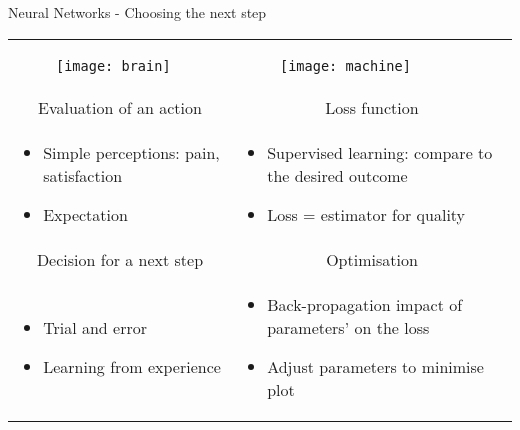 \begin{frame}{Neural Networks - Choosing the next step}
\begin{tabular}{p{5cm}|p{5cm}}
    \begin{figure}
    	\texttt{[image: brain]}
    \end{figure}
    & 
    \begin{figure}
    	\texttt{[image: machine]}
    \end{figure} \\
  \multicolumn{1}{c|}{Evaluation of an action} & \multicolumn{1}{c}{Loss function} \\
    \begin{itemize}
        \item Simple perceptions: pain, satisfaction
        \item Expectation
    \end{itemize}
    & 
    \begin{itemize}
      \item Supervised learning: compare to the desired outcome
      \item Loss = estimator for quality
    \end{itemize} \\
\multicolumn{1}{c|}{Decision for a next step} & \multicolumn{1}{c}{Optimisation} \\
    \begin{itemize}
        \item Trial and error
        \item Learning from experience
    \end{itemize}
    & 
    \begin{itemize}
      \item Back-propagation impact of parameters' on the loss
      \item Adjust parameters to minimise plot
    \end{itemize} 
 \end{tabular}
\end{frame}



